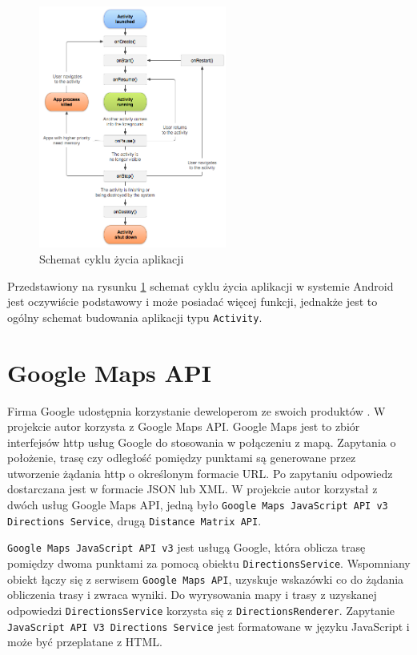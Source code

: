 \documentclass[eng,printmode,oneside]{mgr}
\begin{document}
\begin{figure}
\centering
\includegraphics[width=0.55\textwidth]{andActivityLifecycle.png}
\caption{Schemat cyklu życia aplikacji\cite{developer.android}}
\label{fig:andActivityLifecycle}
\end{figure}

Przedstawiony na rysunku \ref{fig:andActivityLifecycle} schemat cyklu życia aplikacji w systemie
Android jest oczywiście podstawowy i może posiadać więcej funkcji, jednakże jest to ogólny
schemat budowania aplikacji typu \texttt{Activity}.

\section{Google Maps API}

Firma Google udostępnia korzystanie deweloperom ze swoich produktów
\cite{developer.google}. W projekcie autor korzysta z Google Maps API. Google
Maps jest to zbiór interfejsów http usług Google do stosowania w połączeniu z
mapą. Zapytania o położenie, trasę czy odległość pomiędzy punktami są generowane
przez utworzenie żądania http o określonym formacie URL. Po zapytaniu odpowiedz
dostarczana jest w formacie JSON lub XML. W projekcie autor korzystał z dwóch
usług Google Maps API, jedną było \texttt{Google Maps JavaScript API v3
Directions Service}, drugą \texttt{Distance Matrix API}.

\texttt{Google Maps JavaScript API v3} jest usługą Google, która oblicza trasę
pomiędzy dwoma punktami za pomocą obiektu \texttt{DirectionsService}.
Wspomniany obiekt łączy się z serwisem \texttt{Google Maps API}, uzyskuje
wskazówki co do żądania obliczenia trasy i zwraca wyniki. Do wyrysowania mapy i
trasy z uzyskanej odpowiedzi \texttt{DirectionsService} korzysta się z
\texttt{DirectionsRenderer}. Zapytanie \texttt{JavaScript API V3 Directions
Service} jest formatowane w języku JavaScript i może być przeplatane z HTML.
\end{document}
